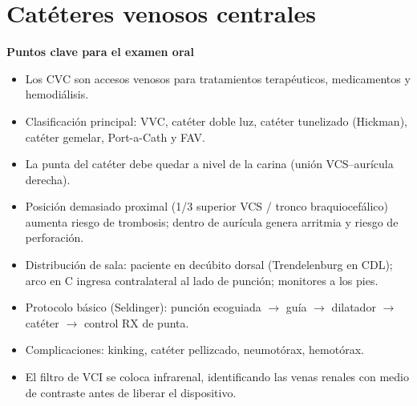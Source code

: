 
\chapter{Catéteres venosos centrales}

	

\begin{cajakeypoints}
	\textbf{\color{azulprincipal} Puntos clave para el examen oral}
	\begin{itemize}[noitemsep, topsep=2pt]
		\item Los CVC son accesos venosos para tratamientos terapéuticos, medicamentos y hemodiálisis.
		\item Clasificación principal: VVC, catéter doble luz, catéter tunelizado (Hickman), catéter gemelar, Port-a-Cath y FAV.
		\item La punta del catéter debe quedar a nivel de la carina (unión VCS--aurícula derecha).
		\item Posición demasiado proximal (1/3 superior VCS / tronco braquiocefálico) aumenta riesgo de trombosis; dentro de aurícula genera arritmia y riesgo de perforación.
		\item Distribución de sala: paciente en decúbito dorsal (Trendelenburg en CDL); arco en C ingresa contralateral al lado de punción; monitores a los pies.
		\item Protocolo básico (Seldinger): punción ecoguiada $\to$ guía $\to$ dilatador $\to$ catéter $\to$ control RX de punta.
		\item Complicaciones: kinking, catéter pellizcado, neumotórax, hemotórax.
		\item El filtro de VCI se coloca infrarenal, identificando las venas renales con medio de contraste antes de liberar el dispositivo.
	\end{itemize}
\end{cajakeypoints}

\vspace{1em}

